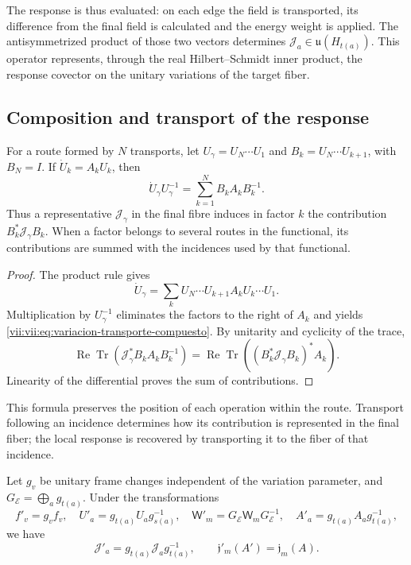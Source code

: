 The response is thus evaluated: on each edge the field is transported,
its difference from the final field is calculated and the energy weight is applied.
The antisymmetrized product of those two vectors determines
\(\mathcal J_a\in\mathfrak u(H_{t(a)})\). This operator represents,
through the real Hilbert--Schmidt inner product, the response covector
on the unitary variations of the target fiber.

\subsection{Composition and transport of the response}
\label{vii:vii:subsec:composicion-respuesta}

\begin{proposition}
\label{vii:vii:prop:composicion-respuesta}
For a route formed by \(N\) transports, let
\(U_\gamma=U_N\cdots U_1\) and
\(B_k=U_N\cdots U_{k+1}\), with \(B_N=I\).
If \(\dot U_k=A_kU_k\), then
\begin{equation}
 \dot U_\gamma U_\gamma^{-1}
 =\sum_{k=1}^N B_kA_kB_k^{-1}.
 \label{vii:vii:eq:variacion-transporte-compuesto}
\end{equation}
Thus a representative \(\mathcal J_\gamma\) in the final fibre
induces in factor \(k\) the contribution
\(B_k^*\mathcal J_\gamma B_k\). When a factor belongs to several
routes in the functional, its contributions are summed with the incidences
used by that functional.
\end{proposition}

\begin{proof}
The product rule gives
\[
 \dot U_\gamma=\sum_k
 U_N\cdots U_{k+1}A_kU_k\cdots U_1.
\]
Multiplication by \(U_\gamma^{-1}\) eliminates the factors to the right
of \(A_k\) and yields \eqref{vii:vii:eq:variacion-transporte-compuesto}.
By unitarity and cyclicity of the trace,
\[
 \operatorname{Re}\operatorname{Tr}
   (\mathcal J_\gamma^*B_kA_kB_k^{-1})
 =\operatorname{Re}\operatorname{Tr}
   ((B_k^*\mathcal J_\gamma B_k)^*A_k).
\]
Linearity of the differential proves the sum of contributions.
\end{proof}

This formula preserves the position of each operation within the route.
Transport following an incidence determines how
its contribution is represented in the final fiber; the local response is recovered
by transporting it to the fiber of that incidence.

\begin{proposition}
\label{vii:vii:prop:covariancia-corriente-memoria}
Let \(g_v\) be unitary frame changes independent of the variation
parameter, and \(G_{\mathcal E}=\bigoplus_a g_{t(a)}\).
Under the transformations
\[
 f'_v=g_vf_v,\quad U'_a=g_{t(a)}U_ag_{s(a)}^{-1},\quad
 \mathsf W'_m=G_{\mathcal E}\mathsf W_mG_{\mathcal E}^{-1},\quad
 A'_a=g_{t(a)}A_ag_{t(a)}^{-1},
\]
we have
\begin{equation}
 \mathcal J'_a=g_{t(a)}\mathcal J_ag_{t(a)}^{-1},
 \qquad \mathfrak j'_m(A')=\mathfrak j_m(A).
 \label{vii:vii:eq:covariancia-respuesta}
\end{equation}
\end{proposition}

